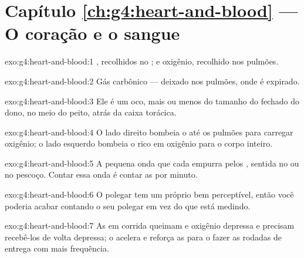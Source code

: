 \section*{Capítulo \ref{ch:g4:heart-and-blood} --- O coração e o sangue}

\begin{solution}{exo:g4:heart-and-blood:1}
, recolhidos no ; e oxigênio, recolhido
nos pulmões.
\end{solution}

\begin{solution}{exo:g4:heart-and-blood:2}
Gás carbônico --- deixado nos pulmões, onde é expirado.
\end{solution}

\begin{solution}{exo:g4:heart-and-blood:3}
Ele é um  oco, mais ou menos do tamanho do  fechado do
dono, no meio do peito, atrás da caixa torácica.
\end{solution}

\begin{solution}{exo:g4:heart-and-blood:4}
O lado direito bombeia o  até os pulmões para carregar
oxigênio; o lado esquerdo bombeia o  rico em oxigênio para o
corpo inteiro.
\end{solution}

\begin{solution}{exo:g4:heart-and-blood:5}
A pequena onda que cada  empurra pelos ,
sentida no  ou no pescoço. Contar essa onda é contar as  por minuto.
\end{solution}

\begin{solution}{exo:g4:heart-and-blood:6}
O polegar tem um  próprio bem perceptível, então você poderia
acabar contando o seu polegar em vez do  que está medindo.
\end{solution}

\begin{solution}{exo:g4:heart-and-blood:7}
As  em corrida queimam  e oxigênio depressa e
precisam recebê-los de volta depressa; o  acelera e reforça
as  para o  fazer as rodadas de entrega com mais
frequência.
\end{solution}


